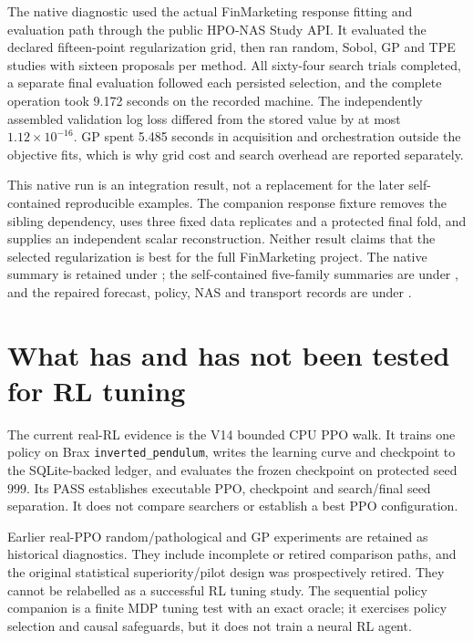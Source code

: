 The native diagnostic used the actual FinMarketing response fitting and
evaluation path through the public HPO-NAS Study API. It evaluated the declared
fifteen-point regularization grid, then ran random, Sobol, GP and TPE studies
with sixteen proposals per method. All sixty-four search trials completed, a
separate final evaluation followed each persisted selection, and the complete
operation took 9.172 seconds on the recorded machine. The independently
assembled validation log loss differed from the stored value by at most
$1.12\times10^{-16}$. GP spent 5.485 seconds in acquisition and orchestration
outside the objective fits, which is why grid cost and search overhead are
reported separately.

This native run is an integration result, not a replacement for the later
self-contained reproducible examples. The companion response fixture removes
the sibling dependency, uses three fixed data replicates and a protected final
fold, and supplies an independent scalar reconstruction. Neither result claims
that the selected regularization is best for the full FinMarketing project.
The native summary is retained under
;
the self-contained five-family summaries are under
, and the repaired forecast,
policy, NAS and transport records are under
.

\section{What has and has not been tested for RL tuning}

The current real-RL evidence is the V14 bounded CPU PPO walk. It trains one
policy on Brax \texttt{inverted\_pendulum}, writes the learning curve and
checkpoint to the SQLite-backed ledger, and evaluates the frozen checkpoint on
protected seed $999$. Its PASS establishes executable PPO, checkpoint and
search/final seed separation. It does not compare searchers or establish a
best PPO configuration.

Earlier real-PPO random/pathological and GP experiments are retained as
historical diagnostics. They include incomplete or retired comparison paths,
and the original statistical superiority/pilot design was prospectively
retired. They cannot be relabelled as a successful RL tuning study. The
sequential policy companion is a finite MDP tuning test with an exact oracle;
it exercises policy selection and causal safeguards, but it does not train a
neural RL agent.

